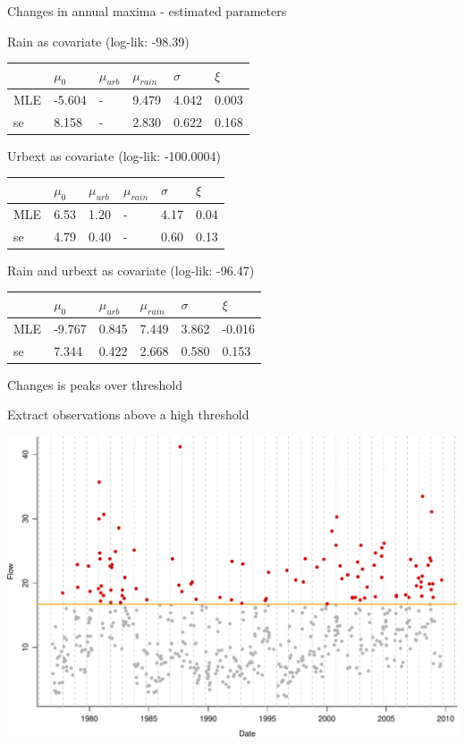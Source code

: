 \documentclass[
  10pt,
  ignorenonframetext,
  compress]{beamer}
\begin{document}
\begin{frame}{Changes in annual maxima - estimated parameters}
\protect\hypertarget{changes-in-annual-maxima---estimated-parameters}{}

Rain as covariate (log-lik: -98.39)

\begin{longtable}[]{@{}llllll@{}}
\toprule
& \(\mu_0\) & \(\mu_{urb}\) & \(\mu_{rain}\) & \(\sigma\) &
\(\xi\)\tabularnewline
\midrule
\endhead
MLE & -5.604 & - & 9.479 & 4.042 & 0.003\tabularnewline
se & 8.158 & - & 2.830 & 0.622 & 0.168\tabularnewline
\bottomrule
\end{longtable}

Urbext as covariate (log-lik: -100.0004)

\begin{longtable}[]{@{}llllll@{}}
\toprule
& \(\mu_0\) & \(\mu_{urb}\) & \(\mu_{rain}\) & \(\sigma\) &
\(\xi\)\tabularnewline
\midrule
\endhead
MLE & 6.53 & 1.20 & - & 4.17 & 0.04\tabularnewline
se & 4.79 & 0.40 & - & 0.60 & 0.13\tabularnewline
\bottomrule
\end{longtable}

Rain and urbext as covariate (log-lik: -96.47)

\begin{longtable}[]{@{}llllll@{}}
\toprule
& \(\mu_0\) & \(\mu_{urb}\) & \(\mu_{rain}\) & \(\sigma\) &
\(\xi\)\tabularnewline
\midrule
\endhead
MLE & -9.767 & 0.845 & 7.449 & 3.862 & -0.016\tabularnewline
se & 7.344 & 0.422 & 2.668 & 0.580 & 0.153\tabularnewline
\bottomrule
\end{longtable}

\end{frame}

\begin{frame}{Changes is peaks over threshold}
\protect\hypertarget{changes-is-peaks-over-threshold}{}

Extract observations above a high threshold

\includegraphics{ProsdocimiPerugia_files/figure-beamer/unnamed-chunk-5-1.pdf}

\end{frame}
\end{document}
